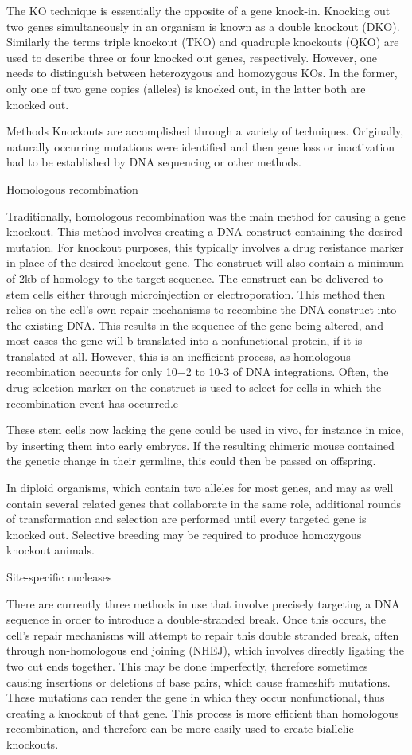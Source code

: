 The KO technique is essentially the opposite of a gene knock-in. Knocking out two genes simultaneously in an organism is known as a double knockout (DKO). Similarly the terms triple knockout (TKO) and quadruple knockouts (QKO) are used to describe three or four knocked out genes, respectively. However, one needs to distinguish between heterozygous and homozygous KOs. In the former, only one of two gene copies (alleles) is knocked out, in the latter both are knocked out.

Methods
Knockouts are accomplished through a variety of techniques. Originally, naturally occurring mutations were identified and then gene loss or inactivation had to be established by DNA sequencing or other methods.

Homologous recombination

Traditionally, homologous recombination was the main method for causing a gene knockout. This method involves creating a DNA construct containing the desired mutation. For knockout purposes, this typically involves a drug resistance marker in place of the desired knockout gene. The construct will also contain a minimum of 2kb of homology to the target sequence. The construct can be delivered to stem cells either through microinjection or electroporation. This method then relies on the cell's own repair mechanisms to recombine the DNA construct into the existing DNA. This results in the sequence of the gene being altered, and most cases the gene will b translated into a nonfunctional protein, if it is translated at all. However, this is an inefficient process, as homologous recombination accounts for only 10−2 to 10-3 of DNA integrations. Often, the drug selection marker on the construct is used to select for cells in which the recombination event has occurred.e

These stem cells now lacking the gene could be used in vivo, for instance in mice, by inserting them into early embryos. If the resulting chimeric mouse contained the genetic change in their germline, this could then be passed on offspring.

In diploid organisms, which contain two alleles for most genes, and may as well contain several related genes that collaborate in the same role, additional rounds of transformation and selection are performed until every targeted gene is knocked out. Selective breeding may be required to produce homozygous knockout animals.

Site-specific nucleases

There are currently three methods in use that involve precisely targeting a DNA sequence in order to introduce a double-stranded break. Once this occurs, the cell's repair mechanisms will attempt to repair this double stranded break, often through non-homologous end joining (NHEJ), which involves directly ligating the two cut ends together. This may be done imperfectly, therefore sometimes causing insertions or deletions of base pairs, which cause frameshift mutations. These mutations can render the gene in which they occur nonfunctional, thus creating a knockout of that gene. This process is more efficient than homologous recombination, and therefore can be more easily used to create biallelic knockouts.

